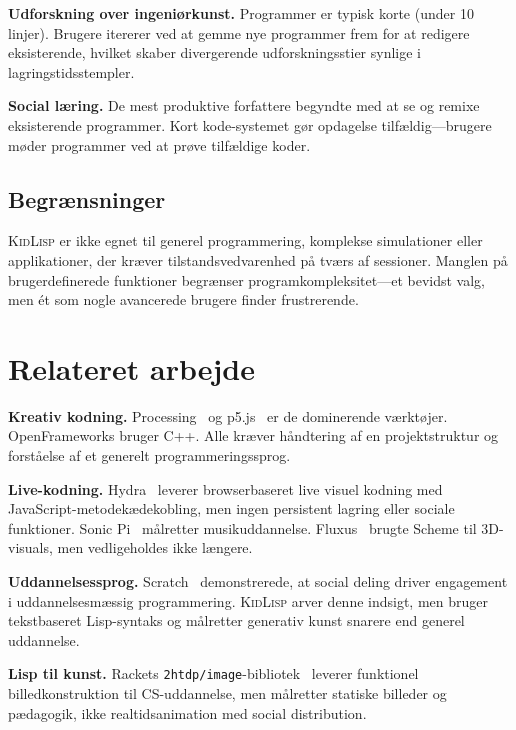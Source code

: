 \documentclass[10pt,letterpaper,twocolumn]{article}
\newcommand{\kidlisp}{\textsc{KidLisp}}
\begin{document}
\textbf{Udforskning over ingeniørkunst.} Programmer er typisk korte (under 10 linjer). Brugere itererer ved at gemme nye programmer frem for at redigere eksisterende, hvilket skaber divergerende udforskningsstier synlige i lagringstidsstempler.

\textbf{Social læring.} De mest produktive forfattere begyndte med at se og remixe eksisterende programmer. Kort kode-systemet gør opdagelse tilfældig---brugere møder programmer ved at prøve tilfældige koder.

\subsection{Begrænsninger}

\kidlisp{} er ikke egnet til generel programmering, komplekse simulationer eller applikationer, der kræver tilstandsvedvarenhed på tværs af sessioner. Manglen på brugerdefinerede funktioner begrænser programkompleksitet---et bevidst valg, men ét som nogle avancerede brugere finder frustrerende.


\section{Relateret arbejde}

\textbf{Kreativ kodning.} Processing~\citep{reas2007processing} og p5.js~\citep{mccarthy2015p5js} er de dominerende værktøjer. OpenFrameworks bruger C++. Alle kræver håndtering af en projektstruktur og forståelse af et generelt programmeringssprog.

\textbf{Live-kodning.} Hydra~\citep{hydra2019} leverer browserbaseret live visuel kodning med JavaScript-metodekædekobling, men ingen persistent lagring eller sociale funktioner. Sonic Pi~\citep{aaron2016sonic} målretter musikuddannelse. Fluxus~\citep{fluxus2007} brugte Scheme til 3D-visuals, men vedligeholdes ikke længere.

\textbf{Uddannelsessprog.} Scratch~\citep{resnick2009scratch} demonstrerede, at social deling driver engagement i uddannelsesmæssig programmering. \kidlisp{} arver denne indsigt, men bruger tekstbaseret Lisp-syntaks og målretter generativ kunst snarere end generel uddannelse.

\textbf{Lisp til kunst.} Rackets \texttt{2htdp/image}-bibliotek~\citep{racket2018} leverer funktionel billedkonstruktion til CS-uddannelse, men målretter statiske billeder og pædagogik, ikke realtidsanimation med social distribution.
\end{document}
